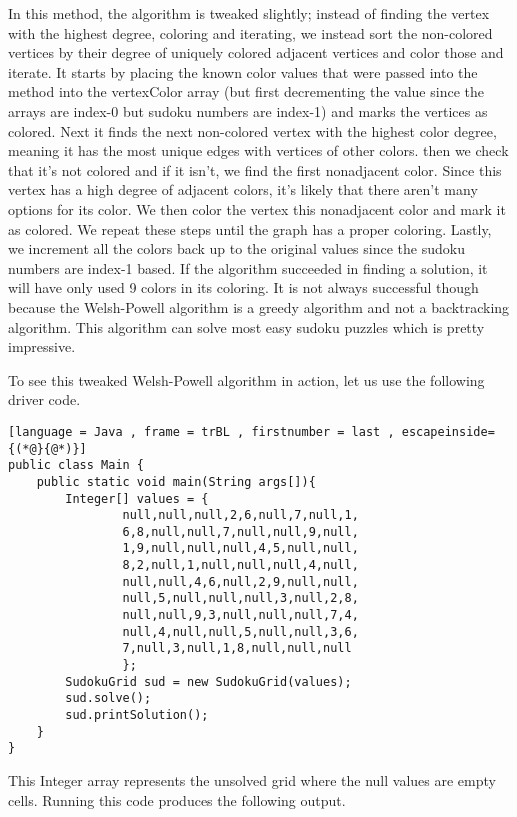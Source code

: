 \documentclass[12pt, letterpaper]{article}
\begin{document}
 In this method, the algorithm is tweaked slightly; instead of finding the vertex with the highest degree, coloring and iterating, we instead sort the non-colored vertices by their degree of uniquely colored adjacent vertices and color those and iterate. It starts by placing the known color values that were passed into the method into the vertexColor array (but first decrementing the value since the arrays are index-0 but sudoku numbers are index-1) and marks the vertices as colored. Next it finds the next non-colored vertex with the highest color degree, meaning it has the most unique edges with vertices of other colors. then we check that it's not colored and if it isn't, we find the first nonadjacent color. Since this vertex has a high degree of adjacent colors, it's likely that there aren't many options for its color. We then color the vertex this nonadjacent color and mark it as colored. We repeat these steps until the graph has a proper coloring. Lastly, we increment all the colors back up to the original values since the sudoku numbers are index-1 based. If the algorithm succeeded in finding a solution, it will have only used 9 colors in its coloring. It is not always successful though because the Welsh-Powell algorithm is a greedy algorithm and not a backtracking algorithm. This algorithm can solve most easy sudoku puzzles which is pretty impressive.
 
To see this tweaked Welsh-Powell algorithm in action, let us use the following driver code.


\begin{lstlisting}[language = Java , frame = trBL , firstnumber = last , escapeinside={(*@}{@*)}]
public class Main {
    public static void main(String args[]){
        Integer[] values = {
                null,null,null,2,6,null,7,null,1,
                6,8,null,null,7,null,null,9,null,
                1,9,null,null,null,4,5,null,null,
                8,2,null,1,null,null,null,4,null,
                null,null,4,6,null,2,9,null,null,
                null,5,null,null,null,3,null,2,8,
                null,null,9,3,null,null,null,7,4,
                null,4,null,null,5,null,null,3,6,
                7,null,3,null,1,8,null,null,null
                };
        SudokuGrid sud = new SudokuGrid(values);
        sud.solve();
        sud.printSolution();
    }
}
\end{lstlisting}


This Integer array represents the unsolved grid where the null values are empty cells. Running this code produces the following output.
\end{document}
